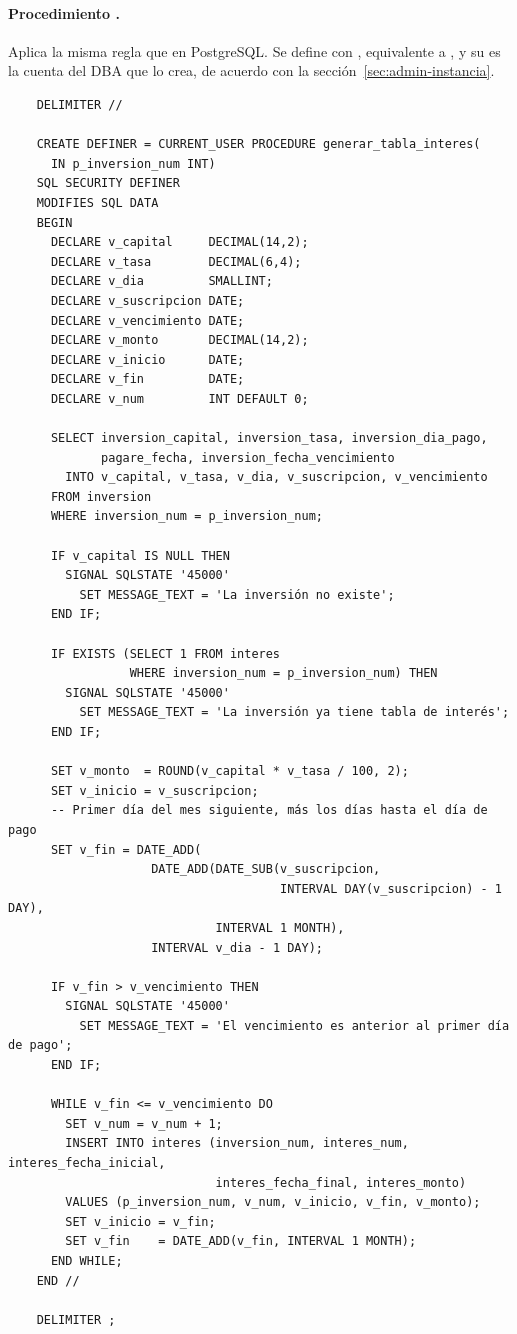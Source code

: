 \paragraph{Procedimiento .} Aplica la misma regla que en PostgreSQL. Se define con , equivalente a , y su  es la cuenta del DBA que lo crea, de acuerdo con la sección~\ref{sec:admin-instancia}.

\begin{verbatim}
	DELIMITER //

	CREATE DEFINER = CURRENT_USER PROCEDURE generar_tabla_interes(
	  IN p_inversion_num INT)
	SQL SECURITY DEFINER
	MODIFIES SQL DATA
	BEGIN
	  DECLARE v_capital     DECIMAL(14,2);
	  DECLARE v_tasa        DECIMAL(6,4);
	  DECLARE v_dia         SMALLINT;
	  DECLARE v_suscripcion DATE;
	  DECLARE v_vencimiento DATE;
	  DECLARE v_monto       DECIMAL(14,2);
	  DECLARE v_inicio      DATE;
	  DECLARE v_fin         DATE;
	  DECLARE v_num         INT DEFAULT 0;

	  SELECT inversion_capital, inversion_tasa, inversion_dia_pago,
	         pagare_fecha, inversion_fecha_vencimiento
	    INTO v_capital, v_tasa, v_dia, v_suscripcion, v_vencimiento
	  FROM inversion
	  WHERE inversion_num = p_inversion_num;

	  IF v_capital IS NULL THEN
	    SIGNAL SQLSTATE '45000'
	      SET MESSAGE_TEXT = 'La inversión no existe';
	  END IF;

	  IF EXISTS (SELECT 1 FROM interes
	             WHERE inversion_num = p_inversion_num) THEN
	    SIGNAL SQLSTATE '45000'
	      SET MESSAGE_TEXT = 'La inversión ya tiene tabla de interés';
	  END IF;

	  SET v_monto  = ROUND(v_capital * v_tasa / 100, 2);
	  SET v_inicio = v_suscripcion;
	  -- Primer día del mes siguiente, más los días hasta el día de pago
	  SET v_fin = DATE_ADD(
	                DATE_ADD(DATE_SUB(v_suscripcion,
	                                  INTERVAL DAY(v_suscripcion) - 1 DAY),
	                         INTERVAL 1 MONTH),
	                INTERVAL v_dia - 1 DAY);

	  IF v_fin > v_vencimiento THEN
	    SIGNAL SQLSTATE '45000'
	      SET MESSAGE_TEXT = 'El vencimiento es anterior al primer día de pago';
	  END IF;

	  WHILE v_fin <= v_vencimiento DO
	    SET v_num = v_num + 1;
	    INSERT INTO interes (inversion_num, interes_num, interes_fecha_inicial,
	                         interes_fecha_final, interes_monto)
	    VALUES (p_inversion_num, v_num, v_inicio, v_fin, v_monto);
	    SET v_inicio = v_fin;
	    SET v_fin    = DATE_ADD(v_fin, INTERVAL 1 MONTH);
	  END WHILE;
	END //

	DELIMITER ;
\end{verbatim}

